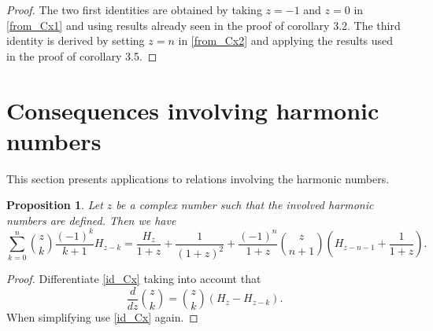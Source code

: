 \documentclass[10pt,a4paper]{amsart}
\numberwithin{equation}{section}
\newtheorem{proposition}[thm]{Proposition}
\begin{document}
\begin{proof}
The two first identities are obtained by taking $z=-1$ and $z=0$ in \eqref{from_Cx1} and using results already seen in the proof of corollary 3.2. The third identity is derived by setting $z=n$ in \eqref{from_Cx2} and applying the results used in the proof of corollary 3.5.
\end{proof}



\section{Consequences involving harmonic numbers}

This section presents applications to relations involving the harmonic numbers.

\begin{proposition}
Let $z$ be a complex number such that the involved harmonic numbers are defined. Then we have
\begin{equation}\label{Har_from_Cx}
\sum_{k=0}^n \binom{z}{k} \frac{(-1)^k}{k+1} H_{z-k} 
= \frac{H_z}{1+z} + \frac{1}{(1+z)^2} + \frac{(-1)^n}{1+z} \binom{z}{n+1} \left ( H_{z-n-1} + \frac{1}{1+z} \right ).
\end{equation}
\end{proposition}
\begin{proof}
Differentiate \eqref{id_Cx} taking into account that
$$\frac{d}{dz} \binom{z}{k} = \binom{z}{k} (H_z - H_{z-k}).$$
When simplifying use \eqref{id_Cx} again.
\end{proof}
\end{document}
